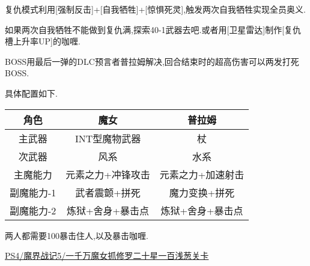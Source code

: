 	复仇模式利用[强制反击]+[自我牺牲]+[惊惧死灵],触发两次自我牺牲实现全员奥义.

	如果两次自我牺牲不能做到复仇满,探索40-1武器去吧.或者用[卫星雷达]制作[复仇槽上升率UP]的咖喱.

	BOSS用最后一弹的DLC预言者普拉姆解决,回合结束时的超高伤害可以两发打死BOSS.

	具体配置如下.

	\begin{center}
		\begin{tabular}
		{| c | c | c |}
		\hline
		角色 & 魔女 & 普拉姆\\
		\hline
		主武器 & INT型魔物武器 & 杖\\
		\hline
		次武器 & 风系 & 水系 \\
		\hline
		主魔能力 & 元素之力+冲锋攻击 & 元素之力+加速射击\\
		\hline
		副魔能力-1 & 武者震颤+拼死 & 魔力变换+拼死\\
		\hline
		副魔能力-2 & 炼狱+舍身+暴击点 & 炼狱+舍身+暴击点\\
		\hline
		\end{tabular}
	\end{center}

	两人都需要100暴击住人,以及暴击咖喱.

	\href{http://www.bilibili.com/video/av3405842/}{PS4/魔界战记5/一千万魔女抓修罗二十星一百浅葱关卡}
